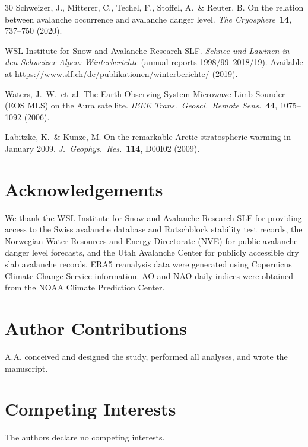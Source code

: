 \documentclass[11pt,letterpaper]{article}
\begin{document}
\begin{thebibliography}{30}
Schweizer, J., Mitterer, C., Techel, F., Stoffel, A.\ \& Reuter, B. On the relation between avalanche occurrence and avalanche danger level. \textit{The Cryosphere}\ \textbf{14}, 737--750 (2020).

WSL Institute for Snow and Avalanche Research SLF. \textit{Schnee und Lawinen in den Schweizer Alpen: Winterberichte} (annual reports 1998/99--2018/19). Available at \url{https://www.slf.ch/de/publikationen/winterberichte/} (2019).

Waters, J.~W.\ et~al. The Earth Observing System Microwave Limb Sounder (EOS MLS) on the Aura satellite. \textit{IEEE Trans.\ Geosci.\ Remote Sens.}\ \textbf{44}, 1075--1092 (2006).

Labitzke, K.\ \& Kunze, M. On the remarkable Arctic stratospheric warming in January 2009. \textit{J.\ Geophys.\ Res.}\ \textbf{114}, D00I02 (2009).

\end{thebibliography}

\section*{Acknowledgements}

We thank the WSL Institute for Snow and Avalanche Research SLF for providing access to the Swiss avalanche database and Rutschblock stability test records, the Norwegian Water Resources and Energy Directorate (NVE) for public avalanche danger level forecasts, and the Utah Avalanche Center for publicly accessible dry slab avalanche records. ERA5 reanalysis data were generated using Copernicus Climate Change Service information. AO and NAO daily indices were obtained from the NOAA Climate Prediction Center.

\section*{Author Contributions}
A.A. conceived and designed the study, performed all analyses, and wrote the manuscript.

\section*{Competing Interests}
The authors declare no competing interests.
\end{document}
